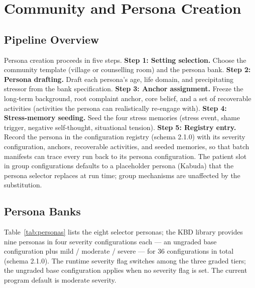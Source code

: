 \documentclass[10pt]{article}
\begin{document}
\appendix

\section{Community and Persona Creation}\label{app:personas}

\subsection{Pipeline Overview}

Persona creation proceeds in five steps.
\textbf{Step 1: Setting selection.} Choose the community template (village or counselling room) and the persona bank.
\textbf{Step 2: Persona drafting.} Draft each persona's age, life domain, and precipitating stressor from the bank specification.
\textbf{Step 3: Anchor assignment.} Freeze the long-term background, root complaint anchor, core belief, and a set of recoverable activities (activities the persona can realistically re-engage with).
\textbf{Step 4: Stress-memory seeding.} Seed the four stress memories (stress event, shame trigger, negative self-thought, situational tension).
\textbf{Step 5: Registry entry.} Record the persona in the configuration registry (schema 2.1.0) with its severity configuration, anchors, recoverable activities, and seeded memories, so that batch manifests can trace every run back to its persona configuration.
The patient slot in group configurations defaults to a placeholder persona (Kabuda) that the persona selector replaces at run time; group mechanisms are unaffected by the substitution.

\subsection{Persona Banks}

Table~\ref{tab:personas} lists the eight selector personas; the KBD library provides nine personas in four severity configurations each --- an ungraded base configuration plus mild / moderate / severe --- for 36 configurations in total (schema 2.1.0).
The runtime severity flag switches among the three graded tiers; the ungraded base configuration applies when no severity flag is set.
The current program default is moderate severity.
\end{document}
